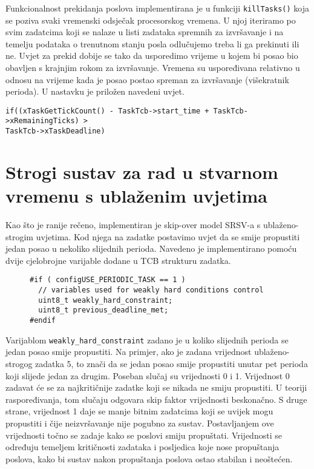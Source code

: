 \documentclass[../zavrsni.tex]{subfiles}
\begin{document}
Funkcionalnost prekidanja poslova implementirana je u funkciji \texttt{killTasks()} koja se poziva svaki vremenski 
odsječak procesorskog vremena. U njoj iteriramo po svim zadatcima koji se 
nalaze u listi zadataka spremnih za izvršavanje i na temelju podataka o trenutnom stanju posla odlučujemo treba li ga prekinuti ili ne.
Uvjet za prekid dobije se tako da usporedimo vrijeme u kojem bi posao bio obavljen s krajnjim rokom za izvršavanje. Vremena su uspoređivana
relativno u odnosu na vrijeme kada je posao postao spreman za izvršavanje (višekratnik perioda).
U nastavku je priložen navedeni uvjet.
\begin{lstlisting}[style=CStyle,caption={Uvjet za prekidanje izvođenja posla},captionpos=b]
if((xTaskGetTickCount() - TaskTcb->start_time + TaskTcb->xRemainingTicks) > 
TaskTcb->xTaskDeadline)
\end{lstlisting}

\section{Strogi sustav za rad u stvarnom vremenu s ublaženim uvjetima}

Kao što je ranije rečeno, implementiran je skip-over model SRSV-a s ublaženo-strogim uvjetima.
Kod njega na zadatke postavimo uvjet da se smije propustiti jedan posao u nekoliko slijednih perioda.
Navedeno je implementirano pomoću dvije cjelobrojne varijable dodane u TCB strukturu zadatka.

\begin{figure}[h]
\centering
\begin{lstlisting}[style=CStyle,caption={Varijable dodane u strukturu za kontrolu zadataka},captionpos=b]
#if ( configUSE_PERIODIC_TASK == 1 )
  // variables used for weakly hard conditions control
  uint8_t weakly_hard_constraint;
  uint8_t previous_deadline_met;
#endif
\end{lstlisting}
\end{figure}

Varijablom \texttt{weakly\_hard\_constraint} zadano je u koliko slijednih perioda se jedan posao smije propustiti.
Na primjer, ako je zadana vrijednost ublaženo-strogog zadatka 5, to znači da se jedan posao smije propustiti unutar pet perioda 
koji slijede jedan za drugim.
Poseban slučaj su vrijednosti 0 i 1. Vrijednost 0 zadavat će se za najkritičnije zadatke koji se nikada ne smiju propustiti. 
U teoriji raspoređivanja, tom slučaju odgovara skip faktor vrijednosti beskonačno.
S druge strane, vrijednost 1 daje se manje bitnim zadatcima koji se uvijek mogu propustiti i čije neizvršavanje nije pogubno za sustav.
Postavljanjem ove vrijednosti točno se zadaje kako se poslovi smiju propuštati. Vrijednosti se određuju 
temeljem kritičnosti zadataka i posljedica koje nose propuštanja poslova, kako bi sustav nakon propuštanja poslova ostao 
stabilan i neoštećen.
\end{document}
